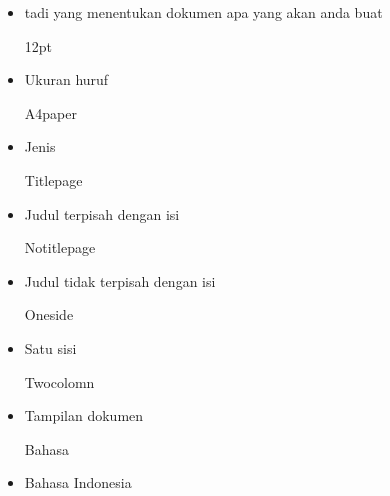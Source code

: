\begin{itemize}

\vspace{\baselineskip}
	\item tadi yang menentukan dokumen apa yang akan anda buat\par

\vspace{\baselineskip}
12pt\par

	\item Ukuran huruf\par

\vspace{\baselineskip}
A4paper\par

	\item Jenis\par

\vspace{\baselineskip}
Titlepage\par

	\item Judul terpisah dengan isi\par

\vspace{\baselineskip}
Notitlepage\par

	\item Judul tidak terpisah dengan isi\par

\vspace{\baselineskip}
Oneside\par

	\item Satu sisi\par

\vspace{\baselineskip}
Twocolomn\par

	\item Tampilan dokumen\par

\vspace{\baselineskip}
Bahasa\par

	\item Bahasa Indonesia
	\vspace{\baselineskip}
	
\end{itemize}\par

